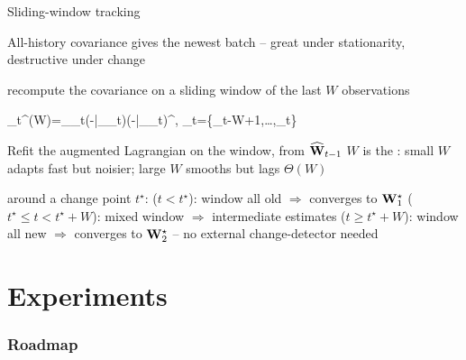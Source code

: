 \documentclass[9pt, aspectratio=169, xcolor=table]{beamer}
\begin{document}
\begin{frame}{Sliding-window tracking}

	\bi All-history covariance gives the newest batch  -- great under stationarity, destructive under change \ei

	\bi {} recompute the covariance on a sliding window of the last $W$ observations
	\begin{myblock}
		\be \bbSigma_t^{(W)}=\sum_{\bbx\in\ccalW_t}(\bbx-\bar{\bbx}_{\ccalW_t})(\bbx-\bar{\bbx}_{\ccalW_t})^\top, \qquad \ccalW_t=\{\bbX_{t-W+1},\ldots,\bbX_t\} \ee
	\end{myblock}
	\ai Refit the augmented Lagrangian on the window,  from $\widehat{{\mathbf W}}_{t-1}$
	\ai $W$ is the : small $W$ adapts fast but noisier; large $W$ smooths but lags $\Theta(W)$\ei

	\pause

	\bi {} around a change point $t^\star$:
	\ai {} ($t<t^\star$): window all old $\Rightarrow$ converges to ${\mathbf W}_1^\star$
	\ai {} ($t^\star\leq t<t^\star{+}W$): mixed window $\Rightarrow$ intermediate estimates
	\ai {} ($t\geq t^\star{+}W$): window all new $\Rightarrow$ converges to ${\mathbf W}_2^\star$
	\ai {} -- no external change-detector needed\ei

\end{frame}

\section{Experiments}
\begin{frame} \frametitle{Roadmap} \tableofcontents[currentsection] \end{frame}

\end{document}
